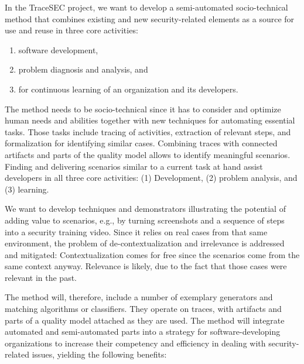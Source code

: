In the TraceSEC project, we want to develop a semi-automated socio-technical method that combines existing and new security-related elements as a source for use and reuse in three core activities:
\begin{enumerate}
	\vspace{-0.5em} \item software development, 
	\vspace{-0.5em} \item problem diagnosis and analysis, and 
	\vspace{-0.5em} \item for continuous learning of an organization and its developers.
\end{enumerate}

The method needs to be socio-technical since it has to consider and optimize human needs and abilities together with new techniques for automating essential tasks. Those tasks include tracing of activities, extraction of relevant steps, and formalization for identifying similar cases. Combining traces with connected artifacts and parts of the quality model allows to identify meaningful scenarios. Finding and delivering scenarios similar to a current task at hand assist developers in all three core activities: (1) Development, (2) problem analysis, and (3) learning. 

We want to develop techniques and demonstrators illustrating the potential of adding value to scenarios, e.g., by turning screenshots and a sequence of steps into a security training video. Since it relies on real cases from that same environment, the problem of de-contextualization and irrelevance is addressed and mitigated: Contextualization comes for free since the scenarios come from the same context anyway. Relevance is likely, due to the fact that those cases were relevant in the past.

The method will, therefore, include a number of exemplary generators and matching algorithms or classifiers. They operate on traces, with artifacts and parts of a quality model attached as they are used. The method will integrate automated and semi-automated parts into a strategy for software-developing organizations to increase their competency and efficiency in dealing with security-related issues, yielding the following benefits:

